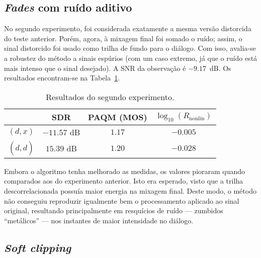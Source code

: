 \subsection{\textit{Fades} com ruído aditivo} \label{subsec:wiener:experiment-2}

No segundo experimento, foi considerada exatamente a mesma versão distorcida do teste
anterior. Porém, agora, à mixagem final foi somado o ruído; assim, o sinal distorcido
foi usado como trilha de fundo para o diálogo. Com isso, avalia-se a robustez do método
a sinais espúrios (com um caso extremo, já que o ruído está mais intenso que o sinal
desejado). A SNR da observação é $-9.17$~dB. Os resultados encontram-se na
Tabela~\ref{tab:wf:experiment-2}. {\def\arraystretch{1.25}\tabcolsep=10pt
\begin{table}[!ht]
	\centering
	\caption[Resultados do segundo experimento: \textit{fades} com ruído aditivo]{Resultados do segundo experimento.}
	\label{tab:wf:experiment-2}
	\begin{tabular}{cccc}
		\toprule
		               & SDR         & PAQM (MOS) & $\log_{10}(R_{\text{nonlin}})$ \\
		\midrule
		$(d, x)$       & $-11.57$ dB & $1.17$     & $-0.005$                       \\
		$(d, \hat{d})$ & $15.39$ dB  & $1.20$     & $-0.028$                       \\ \bottomrule
	\end{tabular}
\end{table}
}

Embora o algoritmo tenha melhorado as medidas, os valores pioraram quando comparados
aos do experimento anterior. Isto era esperado, visto que a trilha descorrelacionada
possuía maior energia na mixagem final. Deste modo, o método não conseguiu reproduzir
igualmente bem o processamento aplicado ao sinal original, resultando principalmente em
resquícios de ruído --- zumbidos ``metálicos'' --- nos instantes de maior intensidade
no diálogo.

\subsection{\textit{Soft clipping}}


